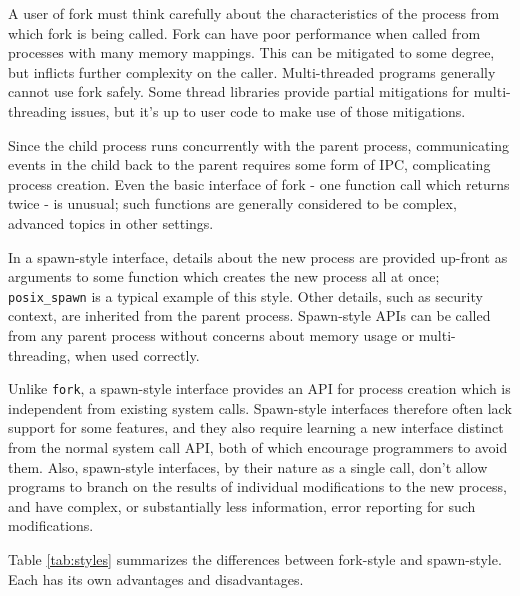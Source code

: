 \documentclass[letterpaper,twocolumn,10pt]{article}
\begin{document}
A user of fork must think carefully about the characteristics of the process from which fork is being called.
Fork can have poor performance when called from processes with many memory mappings.\cite{forkroad}
This can be mitigated to some degree, but inflicts further complexity on the caller.\cite{vfork}\cite{vfork_dangerous}
Multi-threaded programs generally cannot use fork safely.\cite{forkroad}\cite{tlpi}
Some thread libraries provide partial mitigations for multi-threading issues,
but it's up to user code to make use of those mitigations.\cite{pthread_atfork}

Since the child process runs concurrently with the parent process,
communicating events in the child back to the parent requires some form of IPC,
complicating process creation.\cite{posix_spawn_error_pipe}
Even the basic interface of fork - one function call which returns twice - is unusual;
such functions are generally considered to be complex, advanced topics in other settings.
\cite{callcc_fork}\cite{continuations}\cite{bashcc}

In a spawn-style interface,
details about the new process are provided up-front as arguments to some function
which creates the new process all at once;
\texttt{posix\_spawn} is a typical example of this style.\cite{posix_spawn}\cite{create_process}\cite{chainloading}
Other details, such as security context, are inherited from the parent process.\cite{tlpi}\cite{create_process}
Spawn-style APIs
can be called from any parent process without concerns about memory usage or multi-threading,
when used correctly.
\cite{forkroad}\cite{posix_spawn_error_pipe}

Unlike \texttt{fork}, a spawn-style interface provides an API for process creation
which is independent from existing system calls.\cite{spawn_h}\cite{subprocess_run}
Spawn-style interfaces therefore often lack support for some features,
and they also require learning a new interface distinct from the normal system call API,
both of which encourage programmers to avoid them.\cite{tlpi}\cite{posix_spawn_lwn}
Also, spawn-style interfaces, by their nature as a single call,
don't allow programs to branch on the results of individual modifications to the new process,
and have complex, or substantially less information, error reporting for such modifications.
\cite{posix_spawn}\cite{posix_spawn_error_pipe}

Table \ref{tab:styles} summarizes the differences between fork-style and spawn-style.
Each has its own advantages and disadvantages.
\end{document}
